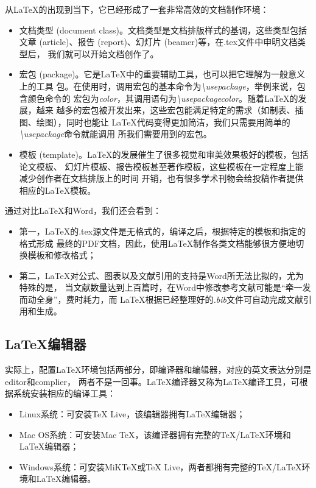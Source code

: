 从LaTeX的出现到当下，它已经形成了一套非常高效的文档制作环境：
\begin{itemize}
    \item 文档类型 (document class)。文档类型是文档排版样式的基调，这些类型包括
          文章 (article)、报告 (report)、幻灯片 (beamer)等，在.tex文件中申明文档类型后，
          我们就可以开始文档创作了。
    \item 宏包 (package)。它是LaTeX中的重要辅助工具，也可以把它理解为一般意义上的工具
          包。在使用时，调用宏包的基本命令为\emph{\textbackslash usepackage{}}，举例来说，包含颜色命令的
          宏包为\emph{color}，其调用语句为\emph{\textbackslash usepackage{color}}。随着LaTeX的发展，越来
          越多的宏包被开发出来，这些宏包能满足特定的需求（如制表、插图、绘图），同时也能让
          LaTeX代码变得更加简洁，我们只需要用简单的\emph{\textbackslash usepackage{}}命令就能调用
          所我们需要用到的宏包。
    \item 模板 (template)。LaTeX的发展催生了很多视觉和审美效果极好的模板，包括论文模板、
          幻灯片模板、报告模板甚至著作模板，这些模板在一定程度上能减少创作者在文档排版上的时间
          开销，也有很多学术刊物会给投稿作者提供相应的LaTeX模板。
\end{itemize}

通过对比LaTeX和Word，我们还会看到：
\begin{itemize}
    \item 第一，LaTeX的.tex源文件是无格式的，编译之后，根据特定的模板和指定的格式形成
          最终的PDF文档，因此，使用LaTeX制作各类文档能够很方便地切换模板和修改格式；
    \item 第二，LaTeX对公式、图表以及文献引用的支持是Word所无法比拟的，尤为特殊的是，
          当文献数量达到上百篇时，在Word中修改参考文献可能是“牵一发而动全身”，费时耗力，而
          LaTeX根据已经整理好的\emph{.bib}文件可自动完成文献引用和生成。
\end{itemize}

\subsection{\LaTeX 编辑器}
实际上，配置LaTeX环境包括两部分，即编译器和编辑器，对应的英文表达分别是editor和complier，
两者不是一回事。LaTeX编译器又称为LaTeX编译工具，可根据系统安装相应的编译工具：
\begin{itemize}
    \item Linux系统：可安装TeX Live，该编辑器拥有LaTeX编辑器；
    \item Mac OS系统：可安装Mac TeX，该编译器拥有完整的TeX/LaTeX环境和LaTeX编辑器；
    \item Windows系统：可安装MiKTeX或TeX Live，两者都拥有完整的TeX/LaTeX环境和LaTeX编辑器。
\end{itemize}

